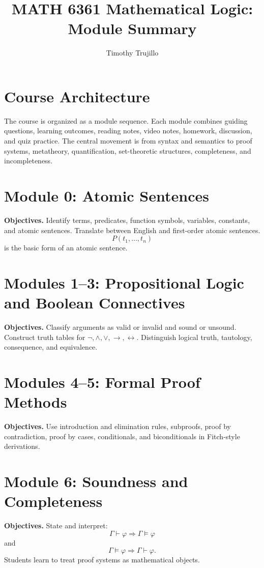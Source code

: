 \documentclass[11pt]{article}
\title{MATH 6361 Mathematical Logic: Module Summary}
\author{Timothy Trujillo}
\date{}
\begin{document}
\maketitle

\section*{Course Architecture}
The course is organized as a module sequence. Each module combines guiding questions, learning outcomes, reading notes, video notes, homework, discussion, and quiz practice. The central movement is from syntax and semantics to proof systems, metatheory, quantification, set-theoretic structures, completeness, and incompleteness.

\section{Module 0: Atomic Sentences}
\textbf{Objectives.} Identify terms, predicates, function symbols, variables, constants, and atomic sentences. Translate between English and first-order atomic sentences.
\[
P(t_1,\ldots,t_n)
\]
is the basic form of an atomic sentence.

\section{Modules 1--3: Propositional Logic and Boolean Connectives}
\textbf{Objectives.} Classify arguments as valid or invalid and sound or unsound. Construct truth tables for \(\neg,\wedge,\vee,\to,\leftrightarrow\). Distinguish logical truth, tautology, consequence, and equivalence.

\section{Modules 4--5: Formal Proof Methods}
\textbf{Objectives.} Use introduction and elimination rules, subproofs, proof by contradiction, proof by cases, conditionals, and biconditionals in Fitch-style derivations.

\section{Module 6: Soundness and Completeness}
\textbf{Objectives.} State and interpret:
\[
\Gamma \vdash \varphi \Rightarrow \Gamma \models \varphi
\]
and
\[
\Gamma \models \varphi \Rightarrow \Gamma \vdash \varphi.
\]
Students learn to treat proof systems as mathematical objects.
\end{document}
